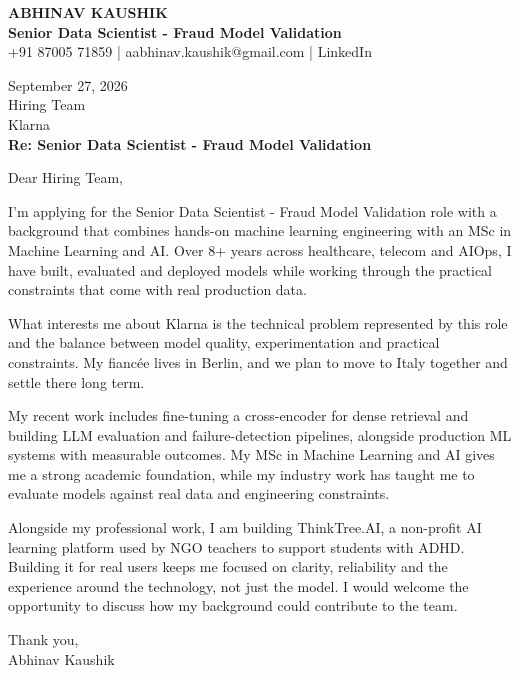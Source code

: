 \documentclass[10pt,a4paper]{article}
\begin{document}
\begin{center}
{\Large\bfseries ABHINAV KAUSHIK}\\[2pt]
{\bfseries Senior Data Scientist - Fraud Model Validation}\\[2pt]
+91 87005 71859 \quad | \quad aabhinav.kaushik@gmail.com \quad | \quad LinkedIn
\end{center}
\vspace{8pt}
September 27, 2026\\[6pt]
Hiring Team\\
Klarna\\[4pt]
\textbf{Re: Senior Data Scientist - Fraud Model Validation}

Dear Hiring Team,

I’m applying for the Senior Data Scientist - Fraud Model Validation role with a background that combines hands-on machine learning engineering with an MSc in Machine Learning and AI. Over 8+ years across healthcare, telecom and AIOps, I have built, evaluated and deployed models while working through the practical constraints that come with real production data.

What interests me about Klarna is the technical problem represented by this role and the balance between model quality, experimentation and practical constraints. My fiancée lives in Berlin, and we plan to move to Italy together and settle there long term.

My recent work includes fine-tuning a cross-encoder for dense retrieval and building LLM evaluation and failure-detection pipelines, alongside production ML systems with measurable outcomes. My MSc in Machine Learning and AI gives me a strong academic foundation, while my industry work has taught me to evaluate models against real data and engineering constraints.

Alongside my professional work, I am building ThinkTree.AI, a non-profit AI learning platform used by NGO teachers to support students with ADHD. Building it for real users keeps me focused on clarity, reliability and the experience around the technology, not just the model. I would welcome the opportunity to discuss how my background could contribute to the team.

Thank you,\\
Abhinav Kaushik
\end{document}
